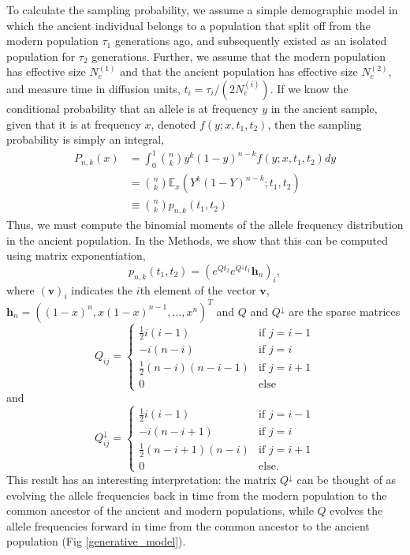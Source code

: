 \documentclass[11pt, oneside]{article}   	%
\begin{document}
To calculate the sampling probability, we assume a simple demographic model in which the ancient individual belongs to a population that split off from the modern population $\tau_1$ generations ago, and subsequently existed as an isolated population for $\tau_2$ generations. Further, we assume that the modern population has effective size $N_e^{(1)}$ and that the ancient population has effective size $N_e^{(2)}$, and measure time in diffusion units, $t_i = \tau_i/(2N_e^{(i)})$. If we know the conditional probability that an allele is at frequency $y$ in the ancient sample, given that it is at frequency $x$, denoted $f(y; x, t_1, t_2)$, then the sampling probability is simply an integral,
\begin{align}
P_{n,k}(x) &= \int_0^1 \binom{n}{k}y^k(1-y)^{n-k}f(y; x, t_1, t_2)dy \nonumber \\
&= \binom{n}{k}\mathbb{E}_x\left(Y^k(1-Y)^{n-k}; t_1, t_2 \right) \nonumber \\
&\equiv \binom{n}{k}p_{n,k}(t_1,t_2)
\end{align}
Thus, we must compute the binomial moments of the allele frequency distribution in the ancient population. In the Methods, we show that this can be computed using matrix exponentiation, 
\begin{equation}
p_{n,k}(t_1,t_2) = \left(e^{Q t_2}e^{Q^\downarrow t_1}\mathbf{h}_n \right)_i,
\label{expectation_matrices}
\end{equation}
where $(\mathbf{v})_i$ indicates the $i$th element of the vector $\mathbf{v}$, $\mathbf{h}_n = ((1-x)^n, x(1-x)^{n-1},\ldots, x^n)^T$ and $Q$ and $Q^\downarrow$ are the sparse matrices
\[
Q_{ij} = \begin{cases}
\frac{1}{2}i(i-1) & \text{if } j = i - 1 \\
-i(n-i) & \text{if } j = i \\
\frac{1}{2}(n-i)(n-i-1) & \text{if } j = i + 1 \\
0 & \text{else}
\end{cases}
\]
and
\[
Q^\downarrow_{ij} = \begin{cases}
\frac{1}{2}i(i-1) & \text{if } j = i -1 \\
-i(n-i+1) & \text{if } j = i \\
\frac{1}{2}(n-i+1)(n-i) &\text{if } j = i + 1 \\
0 & \text{else}.
\end{cases}
\]
This result has an interesting interpretation: the matrix $Q^\downarrow$ can be thought of as evolving the allele frequencies back in time from the modern population to the common ancestor of the ancient and modern populations, while $Q$ evolves the allele frequencies forward in time from the common ancestor to the ancient population (Fig \ref{generative_model}).
\end{document}
